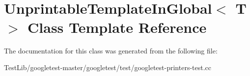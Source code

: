 \hypertarget{classUnprintableTemplateInGlobal}{}\section{Unprintable\+Template\+In\+Global$<$ T $>$ Class Template Reference}
\label{classUnprintableTemplateInGlobal}


The documentation for this class was generated from the following file\+:\begin{DoxyCompactItemize}
\item 
Test\+Lib/googletest-\/master/googletest/test/googletest-\/printers-\/test.\+cc\end{DoxyCompactItemize}

